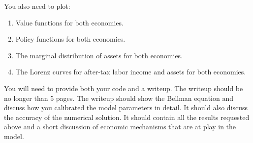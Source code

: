 \documentclass[english,hyperref={pdftex,pdfpagemode=UseNone,hidelinks}]{tufte-handout}
\begin{document}
You also need to plot: \begin{enumerate}
    \item Value functions for both economies.
    \item Policy functions for both economies.
    \item The marginal distribution of assets for both economies.
    \item The Lorenz curves for after-tax labor income and assets for both economies.
\end{enumerate}

You will need to provide both your code and a writeup. The writeup should be no longer than 5 pages. The writeup should show the Bellman equation and discuss how you calibrated the model parameters in detail. It should also discuss the accuracy of the numerical solution. It should contain all the results requested above and a short discussion of economic mechanisms that are at play in the model.
\end{document}

